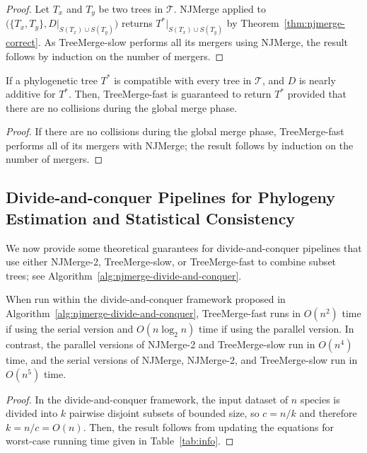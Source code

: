 \begin{proof}
Let $T_x$ and $T_y$ be two trees in $\mathcal{T}$.
NJMerge applied to $\big(\{T_x, T_y\}, D|_{S(T_x) \cup S(T_y)}\big)$ returns $T^*|_{S(T_x) \cup S(T_y)}$ by Theorem~\ref{thm:njmerge-correct}.
As TreeMerge-slow performs all its mergers using NJMerge, the result follows by induction on the number of mergers.
\end{proof}

\begin{theorem}
\label{thm:treemerge-fast-correct}
If a phylogenetic tree $T^*$ is compatible with every tree in $\mathcal{T}$, and $D$ is nearly additive for $T^*$. 
Then, TreeMerge-fast is guaranteed to return $T^*$ provided that there are no collisions during the global merge phase.
\end{theorem}

\begin{proof}
If there are no collisions during the global merge phase, TreeMerge-fast performs all of its mergers with NJMerge; the result follows by induction on the number of mergers.
\end{proof}

\subsection{Divide-and-conquer Pipelines for Phylogeny Estimation and Statistical Consistency}
We now provide some theoretical guarantees for divide-and-conquer pipelines that use either NJMerge-2, TreeMerge-slow, or TreeMerge-fast to combine subset trees; see Algorithm~\ref{alg:njmerge-divide-and-conquer}.

\begin{corollary}
When run within the divide-and-conquer framework proposed in Algorithm~\ref{alg:njmerge-divide-and-conquer}, TreeMerge-fast runs in $O(n^2)$ time if using the serial version and $O(n \log_2{n})$ time if using the parallel version.
In contrast, the parallel versions of NJMerge-2 and TreeMerge-slow run in $O(n^4)$ time, and the serial versions of NJMerge, NJMerge-2, and TreeMerge-slow run in $O(n^5)$ time.
\end{corollary}

\begin{proof}
In the divide-and-conquer framework, the input dataset of $n$ species is divided into $k$ pairwise disjoint subsets of bounded size, so $c = n/k$ and therefore $k = n/c = O(n)$.
Then, the result follows from updating the equations for worst-case running time given in Table~\ref{tab:info}.
\end{proof}

